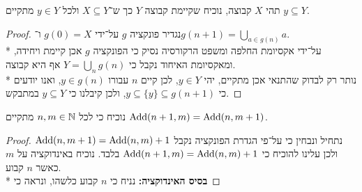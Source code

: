 \Question{}
תהי $X$ קבוצה, נוכיח שקיימת קבוצה $Y$ כך ש־$X \subseteq Y$ ולכל $y \in Y$ מתקיים $y \subseteq Y$.
\begin{proof}
	נגדיר פונקציה $g$ על־ידי $g(0) = X$ ו־$g(n + 1) = \bigcup_{a \in g(n)} a$. \\*
	על־ידי אקסיומת החלפה ומשפט הרקורסיה נסיק כי הפונקציה $g$ אכן קיימת ויחידה, ומאקסיומת האיחוד נקבל כי $Y = \bigcup_n g(n)$ אף היא קבוצה. \\*
	נותר רק לבדוק שהתנאי אכן מתקיים, יהי $y \in Y$, לכן קיים $n$ עבורו $y \in g(n)$, ואנו יודעים כי $y \subseteq \{ y \} \subseteq g(n + 1)$, ולכן קיבלנו כי $y \subseteq Y$ במתבקש.
\end{proof}

\Question{}
\Subquestion{}
נוכיח כי לכל $n, m \in \mathbb{N}$ מתקיים $\operatorname{Add}(n + 1, m) = \operatorname{Add}(n, m + 1)$.
\begin{proof}
	נתחיל ונבחין כי על־פי הגדרת הפונקציה נקבל $\operatorname{Add}(n, m + 1) = \operatorname{Add}(n, m) + 1$ ולכן עלינו להוכיח כי $\operatorname{Add}(n + 1, m) = \operatorname{Add}(n, m) + 1$ בלבד.
	נוכיח באינדוקציה על $m$ כאשר $n$ קבוע. \\*
	\textbf{בסיס האינדוקציה:}
	נניח כי $n$ קבוע כלשהו, ונראה כי
\end{proof}



